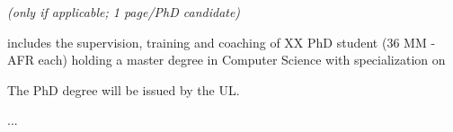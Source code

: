 %
\emph{(only if applicable; 1 page/PhD candidate)}


\noindent
\project includes the supervision, training and coaching of XX  PhD student (36
MM - AFR each) holding a master degree in Computer Science with specialization on

The PhD degree will be issued by the \acf{UL}.

...






%
